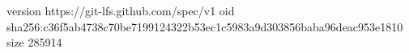 version https://git-lfs.github.com/spec/v1
oid sha256:c36f5ab4738c70be7199124322b53ec1c5983a9d303856baba96deac953e1810
size 285914

